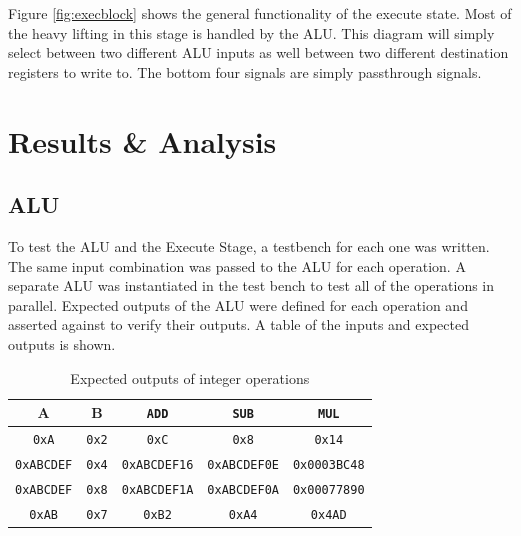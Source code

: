 \documentclass[CMPE]{../KGCOEReport}
\def\code#1{\texttt{#1}}
\begin{document}
	Figure \ref{fig:execblock} shows the general functionality of the execute
	state. Most of the heavy lifting in this stage is handled by the ALU. This
	diagram will simply select between two different ALU inputs as well between
	two different destination registers to write to. The bottom four signals
	are simply passthrough signals.
	
    \section*{Results \& Analysis}

	\subsection*{ALU}

    To test the ALU and the Execute Stage, a testbench for each one was
    written. The same input combination was passed to the ALU for each
    operation. A separate ALU was instantiated in the test bench to test
    all of the operations in parallel.
    Expected outputs of the ALU were defined for each operation and asserted
    against to verify their outputs.
    A table of the inputs and expected outputs is shown.
    
    \begin{table}[H]
        \renewcommand{\arraystretch}{1.2}
        \setlength{\tabcolsep}{12pt}
        \caption{Expected outputs of integer operations}
        \begin{center}
            \begin{tabular}{|c|c||c|c|c|}
                \hline
A & B & \code{ADD} & \code{SUB} & \code{MUL}\\\hline

\code{0xA} & \code{0x2} & \code{0xC} & \code{0x8} & \code{0x14}
\\\hline

\code{0xABCDEF} & \code{0x4} & \code{0xABCDEF16} & \code{0xABCDEF0E} & \code{0x0003BC48}
\\\hline

\code{0xABCDEF} & \code{0x8} & \code{0xABCDEF1A} & \code{0xABCDEF0A} & \code{0x00077890}
\\\hline

\code{0xAB} & \code{0x7} & \code{0xB2} & \code{0xA4} & \code{0x4AD}
\\\hline
            
            
            \end{tabular}
        \end{center}
        \label{tab:asm}
    \end{table}
    
\end{document}
